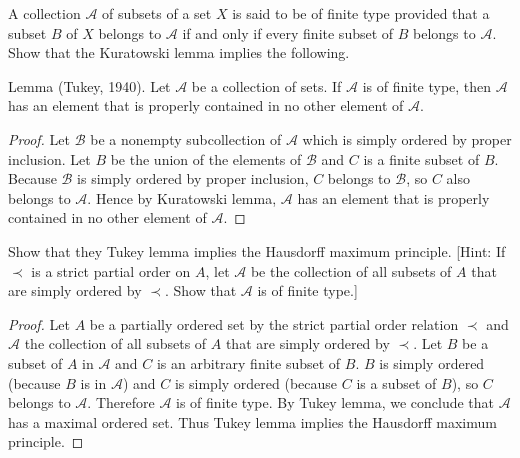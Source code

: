 \begin{exercise}\label{chapter1:section11:exercise6}
    A collection $\mathscr{A}$ of subsets of a set $X$ is said to be of finite type provided that a subset $B$ of $X$ belongs to $\mathscr{A}$ if and only if every finite subset of $B$ belongs to $\mathscr{A}$. Show that the Kuratowski lemma implies the following.

    Lemma (Tukey, 1940). Let $\mathscr{A}$ be a collection of sets. If $\mathscr{A}$ is of finite type, then $\mathscr{A}$ has an element that is properly contained in no other element of $\mathscr{A}$.
\end{exercise}

\begin{proof}
    Let $\mathscr{B}$ be a nonempty subcollection of $\mathscr{A}$ which is simply ordered by proper inclusion. Let $B$ be the union of the elements of $\mathscr{B}$ and $C$ is a finite subset of $B$. Because $\mathscr{B}$ is simply ordered by proper inclusion, $C$ belongs to $\mathscr{B}$, so $C$ also belongs to $\mathscr{A}$. Hence by Kuratowski lemma, $\mathscr{A}$ has an element that is properly contained in no other element of $\mathscr{A}$.
\end{proof}

\begin{exercise}\label{chapter1:section11:exercise7}
    Show that they Tukey lemma implies the Hausdorff maximum principle. [Hint: If $\prec$ is a strict partial order on $A$, let $\mathscr{A}$ be the collection of all subsets of $A$ that are simply ordered by $\prec$. Show that $\mathscr{A}$ is of finite type.]
\end{exercise}

\begin{proof}
    Let $A$ be a partially ordered set by the strict partial order relation $\prec$ and $\mathscr{A}$ the collection of all subsets of $A$ that are simply ordered by $\prec$. Let $B$ be a subset of $A$ in $\mathscr{A}$ and $C$ is an arbitrary finite subset of $B$. $B$ is simply ordered (because $B$ is in $\mathscr{A}$) and $C$ is simply ordered (because $C$ is a subset of $B$), so $C$ belongs to $\mathscr{A}$. Therefore $\mathscr{A}$ is of finite type. By Tukey lemma, we conclude that $\mathscr{A}$ has a maximal ordered set. Thus Tukey lemma implies the Hausdorff maximum principle.
\end{proof}

